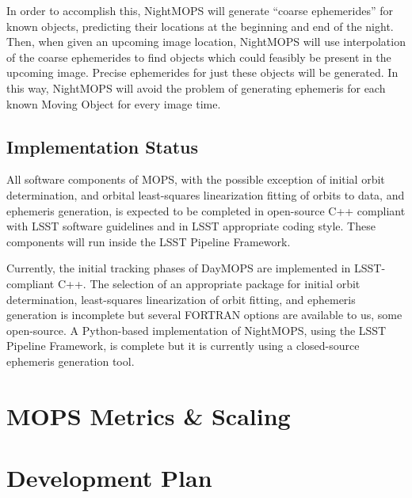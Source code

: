 \documentclass[12pt,preprint]{aastex}
\begin{document}

In order to accomplish this, NightMOPS will generate ``coarse
ephemerides'' for known objects, predicting their locations at the
beginning and end of the night.  Then, when given an upcoming image
location, NightMOPS will use interpolation of the coarse ephemerides
to find objects which could feasibly be present in the upcoming
image. Precise ephemerides for just these objects will be
generated. In this way, NightMOPS will avoid the problem of generating
ephemeris for each known Moving Object for every image time.


\subsection{Implementation Status}

All software components of MOPS, with the possible exception of
initial orbit determination, and orbital least-squares linearization
fitting of orbits to data, and ephemeris generation, is expected to be
completed in open-source C++ compliant with LSST software guidelines
and in LSST appropriate coding style.  These components will run
inside the LSST Pipeline Framework.  

Currently, the initial tracking phases of DayMOPS are implemented in
LSST-compliant C++.  The selection of an appropriate package for
initial orbit determination, least-squares linearization of orbit
fitting, and ephemeris generation is incomplete but several FORTRAN
options are available to us, some open-source.  A Python-based
implementation of NightMOPS, using the LSST Pipeline Framework, is
complete but it is currently using a closed-source ephemeris
generation tool.




\section{MOPS Metrics \& Scaling}



\section{Development Plan}





\end{document}
